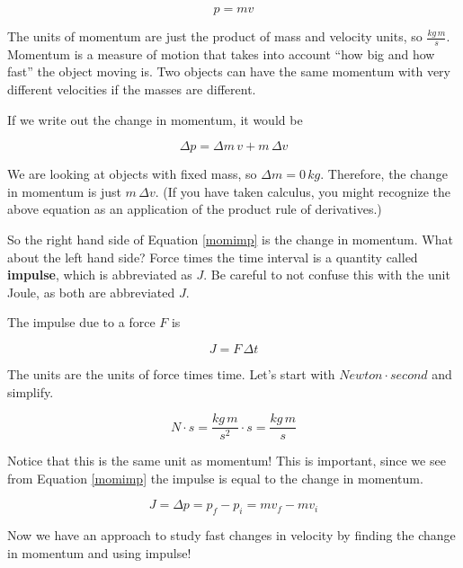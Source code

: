 \documentclass[12pt]{book}
\begin{document}
\begin{equation}
p = mv
\label{momdef}
\end{equation}

The units of momentum are just the product of mass and velocity units, so $\frac{kg \, m}{s}$. Momentum is a measure of motion that takes into account ``how big and how fast'' the object moving is. Two objects can have the same momentum with very different velocities if the masses are different.

If we write out the change in momentum, it would be

\begin{equation}
\Delta p = \Delta m \, v + m \, \Delta v
\end{equation}

We are looking at objects with fixed mass, so $\Delta m = 0 \, kg$. Therefore, the change in momentum is just $m \, \Delta v$. (If you have taken calculus, you might recognize the above equation as an application of the product rule of derivatives.)

So the right hand side of Equation \ref{momimp} is the change in momentum. What about the left hand side? Force times the time interval is a quantity called \textbf{impulse}, which is abbreviated as $J$. Be careful to not confuse this with the unit Joule, as both are abbreviated $J$. 

The impulse due to a force $F$ is

\begin{equation}
J = F \, \Delta t
\label{impdef}
\end{equation}

The units are the units of force times time. Let's start with $Newton \cdot second$ and simplify.

\begin{equation}
N \cdot s = \frac{kg \, m}{s^2} \cdot s = \frac{kg \, m}{s}
\end{equation}

Notice that this is the same unit as momentum! This is important, since we see from Equation \ref{momimp} the impulse is equal to the change in momentum.

\begin{equation}
J = \Delta p = p_f - p_i = m v_f - m v_i
\label{impulse}
\end{equation}

Now we have an approach to study fast changes in velocity by finding the change in momentum and using impulse!
\end{document}
